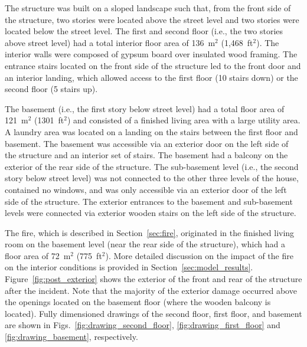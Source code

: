 \documentclass[12pt,oneside]{book}
\begin{document}
The structure was built on a sloped landscape such that, from the front side of the structure, two stories were located above the street level and two stories were located below the street level. The first and second floor (i.e., the two stories above street level) had a total interior floor area of 136~m$^2$ (1,468~ft$^2$). The interior walls were composed of gypsum board over insulated wood framing. The entrance stairs located on the front side of the structure led to the front door and an interior landing, which allowed access to the first floor (10 stairs down) or the second floor (5 stairs up).

The basement (i.e., the first story below street level) had a total floor area of 121~m$^2$ (1301~ft$^2$) and consisted of a finished living area with a large utility area. A laundry area was located on a landing on the stairs between the first floor and basement. The basement was accessible via an exterior door on the left side of the structure and an interior set of stairs. The basement had a balcony on the exterior of the rear side of the structure. The sub-basement level (i.e., the second story below street level) was not connected to the other three levels of the house, contained no windows, and was only accessible via an exterior door of the left side of the structure. The exterior entrances to the basement and sub-basement levels were connected via exterior wooden stairs on the left side of the structure.

The fire, which is described in Section~\ref{sec:fire}, originated in the finished living room on the basement level (near the rear side of the structure), which had a floor area of 72~m$^2$ (775~ft$^2$). More detailed discussion on the impact of the fire on the interior conditions is provided in Section~\ref{sec:model_results}. Figure~\ref{fig:post_exterior} shows the exterior of the front and rear of the structure after the incident. Note that the majority of the exterior damage occurred above the openings located on the basement floor (where the wooden balcony is located). Fully dimensioned drawings of the second floor, first floor, and basement are shown in Figs.~\ref{fig:drawing_second_floor}, \ref{fig:drawing_first_floor} and \ref{fig:drawing_basement}, respectively.

\end{document}
